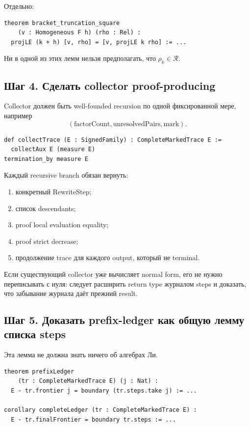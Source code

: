 \documentclass[11pt,a4paper]{article}
\theoremstyle{definition}
\theoremstyle{remark}
\newcommand{\Rel}{\mathcal R}
\begin{document}
Отдельно:

\begin{lstlisting}
theorem bracket_truncation_square
    (v : Homogeneous F h) (rho : Rel) :
  projLE (k + h) [v, rho] = [v, projLE k rho] := ...
\end{lstlisting}

Ни в одной из этих лемм нельзя предполагать, что $\rho_k\in\Rel$.

\subsection{Шаг 4. Сделать collector proof-producing}

Collector должен быть well-founded recursion по одной фиксированной мере,
например
\[
 (\text{factorCount},\text{unresolvedPairs},\text{mark}).
\]

\begin{lstlisting}
def collectTrace (E : SignedFamily) : CompleteMarkedTrace E :=
  collectAux E (measure E)
termination_by measure E
\end{lstlisting}

Каждый recursive branch обязан вернуть:
\begin{enumerate}
\item конкретный RewriteStep;
\item список descendants;
\item proof local evaluation equality;
\item proof strict decrease;
\item продолжение trace для каждого output, который не terminal.
\end{enumerate}

Если существующий collector уже вычисляет normal form, его не нужно
переписывать с нуля: следует расширить return type журналом steps и доказать,
что забывание журнала даёт прежний result.

\subsection{Шаг 5. Доказать prefix-ledger как общую лемму списка steps}

Эта лемма не должна знать ничего об алгебрах Ли.

\begin{lstlisting}
theorem prefixLedger
    (tr : CompleteMarkedTrace E) (j : Nat) :
  E - tr.frontier j = boundary (tr.steps.take j) := ...

corollary completeLedger (tr : CompleteMarkedTrace E) :
  E - tr.finalFrontier = boundary tr.steps := ...
\end{lstlisting}
\end{document}
